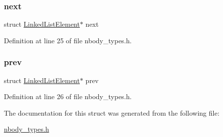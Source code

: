 \hypertarget{struct_linked_list_element_a475866f9885e1659a1704a6b24c81af2}{}\label{struct_linked_list_element_a475866f9885e1659a1704a6b24c81af2} 
\subsubsection{\texorpdfstring{next}{next}}
{\footnotesize\ttfamily struct \hyperlink{struct_linked_list_element}{Linked\+List\+Element}$\ast$ next}



Definition at line 25 of file nbody\+\_\+types.\+h.

\hypertarget{struct_linked_list_element_ab2a338dd2c3ebf3033210507766f2529}{}\label{struct_linked_list_element_ab2a338dd2c3ebf3033210507766f2529} 
\subsubsection{\texorpdfstring{prev}{prev}}
{\footnotesize\ttfamily struct \hyperlink{struct_linked_list_element}{Linked\+List\+Element}$\ast$ prev}



Definition at line 26 of file nbody\+\_\+types.\+h.



The documentation for this struct was generated from the following file\+:\begin{DoxyCompactItemize}
\item 
\hyperlink{nbody__types_8h}{nbody\+\_\+types.\+h}\end{DoxyCompactItemize}
